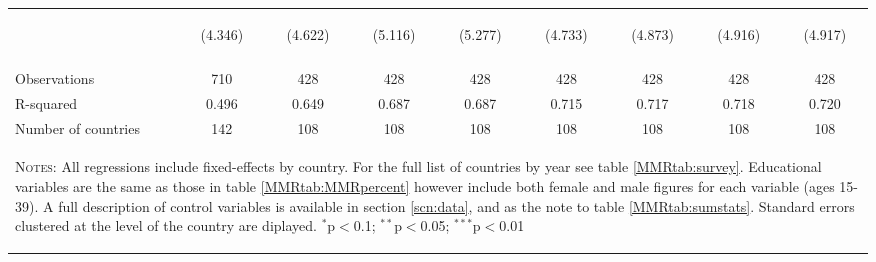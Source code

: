 \begin{landscape}
\begin{table}[htpb!]
\begin{center}
\begin{tabular}{lcccccccc}
&\begin{footnotesize}(4.346)\end{footnotesize}&\begin{footnotesize}(4.622)\end{footnotesize}&\begin{footnotesize}(5.116)\end{footnotesize}&\begin{footnotesize}(5.277)\end{footnotesize}&\begin{footnotesize}(4.733)\end{footnotesize}&\begin{footnotesize}(4.873)\end{footnotesize}&\begin{footnotesize}(4.916)\end{footnotesize}&\begin{footnotesize}(4.917)\end{footnotesize}\\
&&&&&&&&\\Observations&710&428&428&428&428&428&428&428\\
R-squared&0.496&0.649&0.687&0.687&0.715&0.717&0.718&0.720\\
Number of countries&142&108&108&108&108&108&108&108\\
\midrule
\multicolumn{9}{p{20cm}}{\begin{footnotesize}\textsc{Notes:} All regressions include fixed-effects by country. For the full list of countries by year see table \ref{MMRtab:survey}. Educational variables are the same as those in table \ref{MMRtab:MMRpercent} however include both female and male figures for each variable (ages 15-39). A full description of control variables is available in section \ref{scn:data}, and as the note to table \ref{MMRtab:sumstats}.  Standard errors clustered at the level of the country are diplayed.
$^{*}$p$<$0.1; $^{**}$p$<$0.05; $^{***}$p$<$0.01\end{footnotesize}} \\ \bottomrule 
\end{tabular}\end{center}\end{table}\end{landscape}